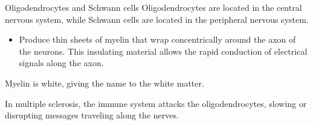 \begin{minipage}{0.82\textwidth}
    \begin{descriptionlist}
        \item[Oligodendrocytes and Schwann cells] 
            Oligodendrocytes are located in the central nervous system, while 
            Schwann cells are located in the peripheral nervous system.
            \begin{itemize}
                \item Produce thin sheets of myelin that wrap concentrically around the axon of the neurons.
                    This insulating material allows the rapid conduction of electrical signals along the axon.
            \end{itemize}

            \begin{remark}
                Myelin is white, giving the name to the white matter.
            \end{remark}

            \begin{remark}
                In multiple sclerosis, the immune system attacks the oligodendrocytes, 
                slowing or disrupting messages traveling along the nerves.
            \end{remark}
    \end{descriptionlist}
\end{minipage}
